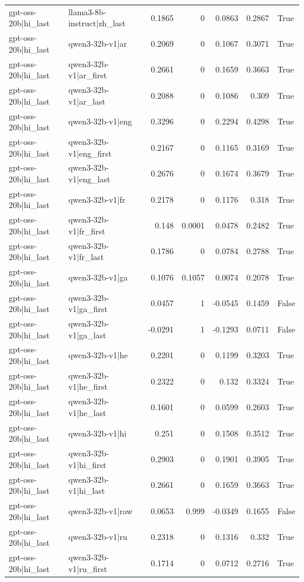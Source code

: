 \begin{table}
\begin{tabular}{l l r r r r l}
gpt-oss-20b|hi_last & llama3-8b-instruct|zh_last & 0.1865 & 0 & 0.0863 & 0.2867 & True \\
gpt-oss-20b|hi_last & qwen3-32b-v1|ar & 0.2069 & 0 & 0.1067 & 0.3071 & True \\
gpt-oss-20b|hi_last & qwen3-32b-v1|ar_first & 0.2661 & 0 & 0.1659 & 0.3663 & True \\
gpt-oss-20b|hi_last & qwen3-32b-v1|ar_last & 0.2088 & 0 & 0.1086 & 0.309 & True \\
gpt-oss-20b|hi_last & qwen3-32b-v1|eng & 0.3296 & 0 & 0.2294 & 0.4298 & True \\
gpt-oss-20b|hi_last & qwen3-32b-v1|eng_first & 0.2167 & 0 & 0.1165 & 0.3169 & True \\
gpt-oss-20b|hi_last & qwen3-32b-v1|eng_last & 0.2676 & 0 & 0.1674 & 0.3679 & True \\
gpt-oss-20b|hi_last & qwen3-32b-v1|fr & 0.2178 & 0 & 0.1176 & 0.318 & True \\
gpt-oss-20b|hi_last & qwen3-32b-v1|fr_first & 0.148 & 0.0001 & 0.0478 & 0.2482 & True \\
gpt-oss-20b|hi_last & qwen3-32b-v1|fr_last & 0.1786 & 0 & 0.0784 & 0.2788 & True \\
gpt-oss-20b|hi_last & qwen3-32b-v1|ga & 0.1076 & 0.1057 & 0.0074 & 0.2078 & True \\
gpt-oss-20b|hi_last & qwen3-32b-v1|ga_first & 0.0457 & 1 & -0.0545 & 0.1459 & False \\
gpt-oss-20b|hi_last & qwen3-32b-v1|ga_last & -0.0291 & 1 & -0.1293 & 0.0711 & False \\
gpt-oss-20b|hi_last & qwen3-32b-v1|he & 0.2201 & 0 & 0.1199 & 0.3203 & True \\
gpt-oss-20b|hi_last & qwen3-32b-v1|he_first & 0.2322 & 0 & 0.132 & 0.3324 & True \\
gpt-oss-20b|hi_last & qwen3-32b-v1|he_last & 0.1601 & 0 & 0.0599 & 0.2603 & True \\
gpt-oss-20b|hi_last & qwen3-32b-v1|hi & 0.251 & 0 & 0.1508 & 0.3512 & True \\
gpt-oss-20b|hi_last & qwen3-32b-v1|hi_first & 0.2903 & 0 & 0.1901 & 0.3905 & True \\
gpt-oss-20b|hi_last & qwen3-32b-v1|hi_last & 0.2661 & 0 & 0.1659 & 0.3663 & True \\
gpt-oss-20b|hi_last & qwen3-32b-v1|raw & 0.0653 & 0.999 & -0.0349 & 0.1655 & False \\
gpt-oss-20b|hi_last & qwen3-32b-v1|ru & 0.2318 & 0 & 0.1316 & 0.332 & True \\
gpt-oss-20b|hi_last & qwen3-32b-v1|ru_first & 0.1714 & 0 & 0.0712 & 0.2716 & True \\

\end{tabular}
\end{table}
